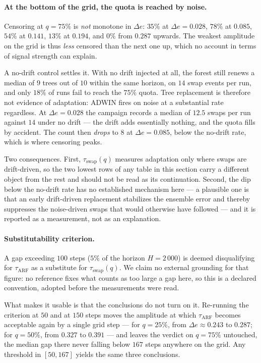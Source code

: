 \documentclass[11pt,a4paper]{article}
\begin{document}
\paragraph{At the bottom of the grid, the quota is reached by noise.} Censoring at
$q = 75\%$ is \emph{not} monotone in $\Delta e$: $35\%$ at $\Delta e = 0.028$, $78\%$ at
$0.085$, $54\%$ at $0.141$, $13\%$ at $0.194$, and $0\%$ from $0.287$ upwards. The
weakest amplitude on the grid is thus \emph{less} censored than the next one up, which no
account in terms of signal strength can explain.

A no-drift control settles it. With no drift injected at all, the forest still renews a
median of $9$ trees out of $10$ within the same horizon, on $14$ swap events per run, and
only $18\%$ of runs fail to reach the $75\%$ quota. Tree replacement is therefore not
evidence of adaptation: ADWIN fires on noise at a substantial rate regardless. At
$\Delta e = 0.028$ the campaign records a median of $12.5$ swaps per run against $14$
under no drift --- the drift adds essentially nothing, and the quota fills by accident.
The count then \emph{drops} to $8$ at $\Delta e = 0.085$, below the no-drift rate, which
is where censoring peaks.

Two consequences. First, $\tau_{\mathrm{swap}}(q)$ measures adaptation only where swaps
are drift-driven, so the two lowest rows of any table in this section carry a different
object from the rest and should not be read as its continuation. Second, the dip below
the no-drift rate has no established mechanism here --- a plausible one is that an early
drift-driven replacement stabilizes the ensemble error and thereby suppresses the
noise-driven swaps that would otherwise have followed --- and it is reported as a
measurement, not as an explanation.

\paragraph{Substitutability criterion.} A gap exceeding $100$ steps ($5\%$ of the
horizon $H = 2\,000$) is deemed disqualifying for $\tau_{\mathrm{ARF}}$ as a substitute
for $\tau_{\mathrm{swap}}(q)$. We claim no external grounding for that figure: no
reference fixes what counts as too large a gap here, so this is a declared convention,
adopted before the measurements were read.

What makes it usable is that the conclusions do not turn on it. Re-running the criterion
at $50$ and at $150$ steps moves the amplitude at which $\tau_{\mathrm{ARF}}$ becomes
acceptable again by a single grid step --- for $q = 25\%$, from $\Delta e \approx 0.243$
to $0.287$; for $q = 50\%$, from $0.327$ to $0.391$ --- and leaves the verdict on
$q = 75\%$ untouched, the median gap there never falling below $167$ steps anywhere on
the grid. Any threshold in $[50, 167]$ yields the same three conclusions.
\end{document}
